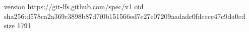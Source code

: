 version https://git-lfs.github.com/spec/v1
oid sha256:d578ca2a369c3898b87d7f0b151566ed7c27e07209aadadc0fdcecc47c9da0cd
size 1791
